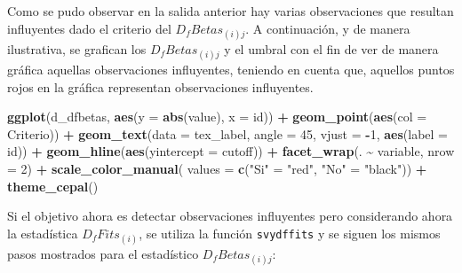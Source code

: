 \documentclass[
  12pt,
]{book}
\newenvironment{Shaded}{\begin{snugshade}}{\end{snugshade}}
\newcommand{\AttributeTok}[1]{\textcolor[rgb]{0.13,0.29,0.53}{#1}}
\newcommand{\DecValTok}[1]{\textcolor[rgb]{0.00,0.00,0.81}{#1}}
\newcommand{\FunctionTok}[1]{\textcolor[rgb]{0.13,0.29,0.53}{\textbf{#1}}}
\newcommand{\NormalTok}[1]{#1}
\newcommand{\OtherTok}[1]{\textcolor[rgb]{0.56,0.35,0.01}{#1}}
\newcommand{\SpecialCharTok}[1]{\textcolor[rgb]{0.81,0.36,0.00}{\textbf{#1}}}
\newcommand{\StringTok}[1]{\textcolor[rgb]{0.31,0.60,0.02}{#1}}
\begin{document}
Como se pudo observar en la salida anterior hay varias observaciones que resultan influyentes dado el criterio del \(D_{f}Betas_{\left(i\right)j}\). A continuación, y de manera ilustrativa, se grafican los \(D_{f}Betas_{\left(i\right)j}\) y el umbral con el fin de ver de manera gráfica aquellas observaciones influyentes, teniendo en cuenta que, aquellos puntos rojos en la gráfica representan observaciones influyentes.

\begin{Shaded}
\begin{Highlighting}[]
\FunctionTok{ggplot}\NormalTok{(d\_dfbetas, }\FunctionTok{aes}\NormalTok{(}\AttributeTok{y =} \FunctionTok{abs}\NormalTok{(value), }\AttributeTok{x =}\NormalTok{ id)) }\SpecialCharTok{+}
  \FunctionTok{geom\_point}\NormalTok{(}\FunctionTok{aes}\NormalTok{(}\AttributeTok{col =}\NormalTok{ Criterio)) }\SpecialCharTok{+}
  \FunctionTok{geom\_text}\NormalTok{(}\AttributeTok{data =}\NormalTok{ tex\_label,}
            \AttributeTok{angle =} \DecValTok{45}\NormalTok{,}
            \AttributeTok{vjust =} \SpecialCharTok{{-}}\DecValTok{1}\NormalTok{,}
            \FunctionTok{aes}\NormalTok{(}\AttributeTok{label =}\NormalTok{ id)) }\SpecialCharTok{+}
  \FunctionTok{geom\_hline}\NormalTok{(}\FunctionTok{aes}\NormalTok{(}\AttributeTok{yintercept =}\NormalTok{ cutoff)) }\SpecialCharTok{+}
  \FunctionTok{facet\_wrap}\NormalTok{(. }\SpecialCharTok{\textasciitilde{}}\NormalTok{ variable, }\AttributeTok{nrow =} \DecValTok{2}\NormalTok{) }\SpecialCharTok{+}
  \FunctionTok{scale\_color\_manual}\NormalTok{(}
    \AttributeTok{values =} \FunctionTok{c}\NormalTok{(}\StringTok{"Si"} \OtherTok{=} \StringTok{"red"}\NormalTok{, }\StringTok{"No"} \OtherTok{=} \StringTok{"black"}\NormalTok{)) }\SpecialCharTok{+}
  \FunctionTok{theme\_cepal}\NormalTok{()}
\end{Highlighting}
\end{Shaded}

Si el objetivo ahora es detectar observaciones influyentes pero considerando ahora la estadística \(D_{f}Fits_{\left(i\right)}\), se utiliza la función \texttt{svydffits} y se siguen los mismos pasos mostrados para el estadístico \(D_{f}Betas_{\left(i\right)j}\):
\end{document}
